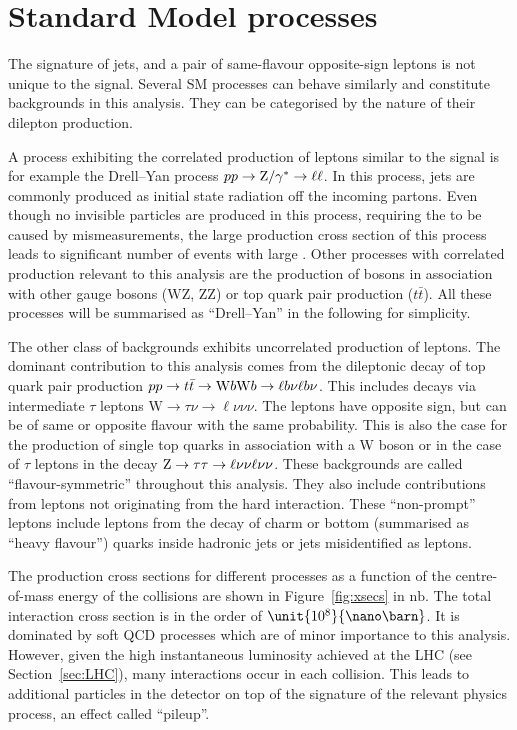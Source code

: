 \section{Standard Model processes}
\label{sec:SMBackgrounds}
The signature of jets, \MET and a pair of same-flavour opposite-sign leptons is not unique to the signal. Several SM processes can behave similarly and constitute backgrounds in this analysis. They can be categorised by the nature of their dilepton production. 

A process exhibiting the correlated production of leptons similar to the signal is for example the Drell--Yan process $pp \rightarrow \mathrm{Z}/\gamma^{*}\rightarrow \ell\ell$. In this process, jets are commonly produced as initial state radiation off the incoming partons. Even though no invisible particles are produced in this process, requiring the \MET to be caused by mismeasurements, the large production cross section of this process leads to significant number of events with large \MET. Other processes with correlated production relevant to this analysis are the production of \Z bosons in association with other gauge bosons ($\mathrm{WZ}$, $\mathrm{ZZ}$) or top quark pair production ($t\bar{t}$\Z). All these processes will be summarised as ``Drell--Yan'' in the following for simplicity. 

The other class of backgrounds exhibits uncorrelated production of leptons. The dominant contribution to this analysis comes from the dileptonic decay of top quark pair production $pp\rightarrow t\bar{t} \rightarrow \mathrm{W} b \mathrm{W} b\rightarrow \ell b\nu \ell b \nu$. This includes decays via intermediate $\tau$ leptons $\text{W}\rightarrow \tau \nu \rightarrow \ell \nu \nu \nu$. The leptons have opposite sign, but can be of same or opposite flavour with the same probability. This is also the case for the production of single top quarks in association with a W boson or in the case of $\tau$ leptons in the decay $\mathrm{Z} \rightarrow \tau\tau \rightarrow \ell\nu\nu\ell\nu\nu$. These backgrounds are called ``flavour-symmetric'' throughout this analysis. They also include contributions from leptons not originating from the hard interaction. These ``non-prompt'' leptons include leptons from the decay of charm or bottom (summarised as ``heavy flavour'') quarks inside hadronic jets or jets misidentified as leptons.

The production cross sections for different processes as a function of the centre-of-mass energy of the collisions are shown in Figure~\ref{fig:xsecs} in $\mathrm{nb}$. The total interaction cross section is in the order of $\unit{10^{8}}{\nano\barn}$. It is dominated by soft QCD processes which are of minor importance to this analysis. However, given the high instantaneous luminosity achieved at the LHC (see Section~\ref{sec:LHC}), many interactions occur in each collision. This leads to additional particles in the detector on top of the signature of the relevant physics process, an effect called ``pileup''.

